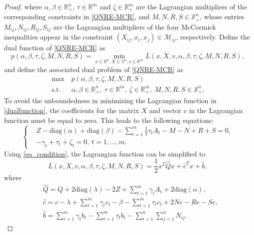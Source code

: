 \documentclass[10pt,a4paper]{amsart}
\begin{document}
\begin{proof}
	where $\alpha,\beta\in \mathbb{R}^n_+$, $\tau\in \mathbb{R}^m$ and $\zeta\in \mathbb{R}^m_+$ are the Lagrangian multipliers of the corresponding constraints in \eqref{QNRE-MCR}, and $M, N, R, S \in \mathbb{X}^n_+$, whose entries $M_{ij}, N_{ij}, R_{ij}, S_{ij}$ are the Lagrangian multipliers of the four McCormick inequalities appear in the constraint $\left(X_{ij},x_i,x_j\right)\in \mathcal{M}_{ij}$, respectively. Define the dual function of \eqref{QNRE-MCR} as
	\begin{equation}\label{dualfunction}
		p(\alpha,\beta,\tau,\zeta,M,N,R,S)=\min_{x\in\mathbb{R}^n,X\in\mathbb{S}^n,v\in\mathbb{R}^m}L(x,X,v,\alpha,\beta,\tau,\zeta,M,N,R,S),
	\end{equation}
	and define the associated dual problem of \eqref{QNRE-MCR} as
	\begin{equation}\label{QNR-dual}
		\begin{aligned}
			\max ~&p(\alpha,\beta,\tau,\zeta,M,N,R,S)\\
			\mbox{s.t.} ~~&\alpha,\beta\in \mathbb{R}^n_+,~\tau\in \mathbb{R}^m,~\zeta\in \mathbb{R}^m_+, ~M,N,R,S\in\mathbb{X}_+^n.
		\end{aligned}
	\end{equation}
	To avoid the unboundedness in minimizing the Lagrangian function in \eqref{dualfunction}, the coefficients for the matrix $X$ and vector $v$ in the Lagrangian function must be equal to zero. This leads to the following equations:
	\begin{equation}\label{eq_condition}
		\left\{
		\begin{aligned}
			&Z-\textrm{diag}(\alpha)+\textrm{diag}(\beta)-\sum_{t=1}^m\frac{1}{2} \tau_t A_t-M-N+R+S= 0,\\
			&-\gamma_t+\tau_t+\zeta_t=0,~t=1,\ldots,m.
		\end{aligned}\right.
	\end{equation}
	Using \eqref{eq_condition}, the Lagrangian function can be simplified to
	\begin{equation}
		L(x,X,v,\alpha,\beta,\tau,\zeta,M,N,R,S) = \frac{1}{2}x^T \hat{Q} x + \hat{c}^T x + \hat{b},
	\end{equation}
	where
	\begin{align}
		&\hat{Q}=Q+2\textrm{diag}(\lambda)-2Z+\sum_{t=1}^m \gamma_t A_t +2\textrm{diag}(\alpha),\\
		&\hat{c}=c-\lambda+\sum_{t=1}^m \gamma_t c_t-\beta- \sum_{t=1}^m \tau_t c_t +2Ne-Re-Se,\\
		&\hat{b}=\sum_{t=1}^m \gamma_t b_t-\sum_{t=1}^m \tau_t b_t-\sum_{i=1}^n\sum_{j=1}^n N_{ij}.

\end{align}
\end{proof}
\end{document}
